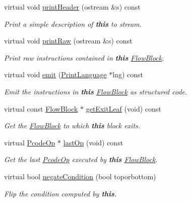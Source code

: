 \begin{DoxyCompactItemize}
virtual void \mbox{\hyperlink{class_block_basic_a5a0f22c6bd8b164e787dc6a6d756952a}{print\+Header}} (ostream \&s) const
\begin{DoxyCompactList}\small\item\em Print a simple description of {\bfseries{this}} to stream. \end{DoxyCompactList}\item 
virtual void \mbox{\hyperlink{class_block_basic_a5981c3195bd4c3fd7be7e750a580bbca}{print\+Raw}} (ostream \&s) const
\begin{DoxyCompactList}\small\item\em Print raw instructions contained in {\bfseries{this}} \mbox{\hyperlink{class_flow_block}{Flow\+Block}}. \end{DoxyCompactList}\item 
virtual void \mbox{\hyperlink{class_block_basic_a0b163426cb08cdecdcdd7305ecc6381e}{emit}} (\mbox{\hyperlink{class_print_language}{Print\+Language}} $\ast$lng) const
\begin{DoxyCompactList}\small\item\em Emit the instructions in {\bfseries{this}} \mbox{\hyperlink{class_flow_block}{Flow\+Block}} as structured code. \end{DoxyCompactList}\item 
virtual const \mbox{\hyperlink{class_flow_block}{Flow\+Block}} $\ast$ \mbox{\hyperlink{class_block_basic_ad0ca2052c33af69cce69198ebfac27d1}{get\+Exit\+Leaf}} (void) const
\begin{DoxyCompactList}\small\item\em Get the \mbox{\hyperlink{class_flow_block}{Flow\+Block}} to which {\bfseries{this}} block exits. \end{DoxyCompactList}\item 
virtual \mbox{\hyperlink{class_pcode_op}{Pcode\+Op}} $\ast$ \mbox{\hyperlink{class_block_basic_a42c5313d7980138d098e184b249b6415}{last\+Op}} (void) const
\begin{DoxyCompactList}\small\item\em Get the last \mbox{\hyperlink{class_pcode_op}{Pcode\+Op}} executed by {\bfseries{this}} \mbox{\hyperlink{class_flow_block}{Flow\+Block}}. \end{DoxyCompactList}\item 
virtual bool \mbox{\hyperlink{class_block_basic_aa15eaf687397a3b73da57abbb061a04c}{negate\+Condition}} (bool toporbottom)
\begin{DoxyCompactList}\small\item\em Flip the condition computed by {\bfseries{this}}. \end{DoxyCompactList}\item 

\end{DoxyCompactItemize}
